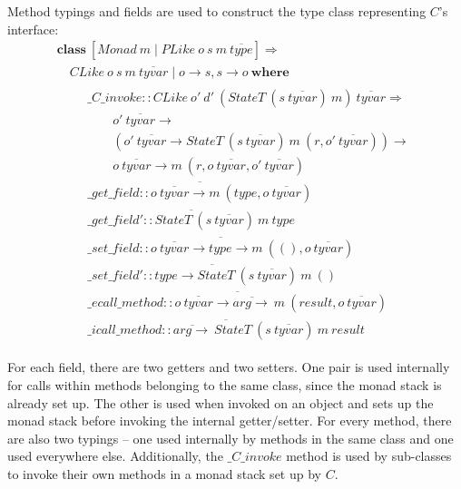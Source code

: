 \documentclass[authoryear,preprint]{sigplanconf}
\begin{document}
Method typings and fields are used to construct the type class representing $C$'s interface: 
\begin{displaymath}
\begin{array}{l}
\mathbf{class}~[\mathit{Monad}~m \mid \mathit{PLike}~o~s~m~\overline{\mathit{type}}] \Rightarrow \\
\quad \mathit{CLike}~o~s~m~\overline{\mathit{tyvar}} \mid o \to s, s \to o~\mathbf{where} \\
\qquad \begin{array}{l}
\_\mathit{C}\_\mathit{invoke} :: \mathit{CLike}~o'~d'~(\mathit{StateT}~(s~\overline{\mathit{tyvar}})~m)~\overline{\mathit{tyvar}} \Rightarrow \\
\qquad o'~\overline{\mathit{tyvar}} \to \\ \qquad (o'~\overline{\mathit{tyvar}} \to \mathit{StateT}~(s~\overline{\mathit{tyvar}})~m~(r,o'~\overline{\mathit{tyvar}})) \to\\\qquad
o~\overline{\mathit{tyvar}} \to m~(r,o~\overline{\mathit{tyvar}},o'~\overline{\mathit{tyvar}}) \\
\overline{\_\mathit{get}\_\mathit{field} :: o~\overline{\mathit{tyvar}} \to m~(\mathit{type}, o~\overline{\mathit{tyvar}}) } \\
\overline{\_\mathit{get}\_\mathit{field}' :: \mathit{StateT}~(s~\overline{\mathit{tyvar}})~m~\mathit{type}} \\
\overline{\_\mathit{set}\_\mathit{field} :: o~\overline{\mathit{tyvar}} \to \mathit{type} \to m~((),o~\overline{\mathit{tyvar}})} \\
\overline{\_\mathit{set}\_\mathit{field}' :: \mathit{type} \to \mathit{StateT}~(s~\overline{\mathit{tyvar}})~m~()} \\
\overline{\mathit{\_ecall\_method} :: o~\overline{\mathit{tyvar}} \to \overline{\mathit{arg} \to}~m~(\mathit{result},o~\overline{\mathit{tyvar}})}\\
\overline{\_\mathit{icall\_method} :: \overline{\mathit{arg} \to}~ \mathit{StateT}~(s~\overline{\mathit{tyvar}})~m~\mathit{result} }
\end{array}
\end{array}
\end{displaymath}

For each field, there are two getters and two setters. One pair is used internally for calls within methods belonging to the same class, since the monad stack is already set up. The other is used when invoked on an object and sets up the monad stack before invoking the internal getter/setter. For every method, there are also two typings -- one used internally by methods in the same class and one used everywhere else. Additionally, the $\_\mathit{C}\_\mathit{invoke}$ method is used by sub-classes to invoke their own methods in a monad stack set up by $C$.
\end{document}
